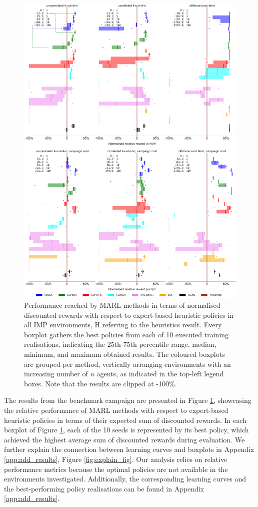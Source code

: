 \begin{figure}
    \centering
    \includegraphics[width=\textwidth]{tex_thesis/figures/ch5/boxplot_perc_limit.pdf}
\caption{Performance reached by MARL methods in terms of normalised discounted rewards with respect to expert-based heuristic policies in all IMP environments, H referring to the heuristics result.
Every boxplot gathers the best policies from each of 10 executed training realisations, indicating the 25th-75th percentile range, median, minimum, and maximum obtained results.
The coloured boxplots are grouped per method, vertically arranging environments with an increasing number of $n$ agents, as indicated in the top-left legend boxes.
Note that the results are clipped at -100\%.
}
\label{fig:results}
\end{figure}

The results from the benchmark campaign are presented in Figure \ref{fig:results}, showcasing the relative performance of MARL methods with respect to expert-based heuristic policies in terms of their expected sum of discounted rewards.
In each boxplot of Figure \ref{fig:results}, each of the 10 seeds is represented by its best policy, which achieved the highest average sum of discounted rewards during evaluation.
We further explain the connection between learning curves and boxplots in Appendix \ref{app:add_results}, Figure \ref{fig:explain_fig}.
Our analysis relies on relative performance metrics because the optimal policies are not available in the environments investigated.
Additionally, the corresponding learning curves and the best-performing policy realisations can be found in Appendix \ref{app:add_results}.

